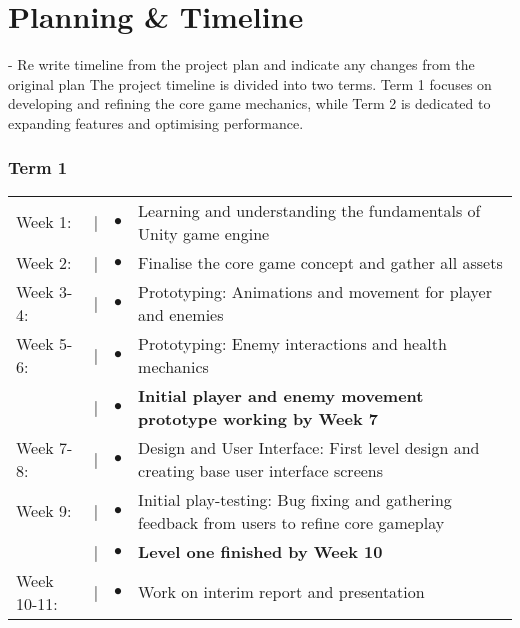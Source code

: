 \documentclass[]{final_report}
\begin{document}
\chapter{Planning \& Timeline}
- Re write timeline from the project plan and indicate any changes from the original plan\newline
The project timeline is divided into two terms. Term 1 focuses on developing and refining the core game mechanics, while Term 2 is dedicated to expanding features and optimising performance.

\subsection{Term 1}
\begin{tabular}{@{}p{2cm}@{}>{\raggedright\arraybackslash}p{0.5cm}@{}>{\raggedright\arraybackslash}p{0.5cm}@{}p{12cm}}
Week 1: & \textcolor{black}{|} & $\bullet$ & Learning and understanding the fundamentals of Unity game engine \\
Week 2: & \textcolor{black}{|} & $\bullet$ & Finalise the core game concept and gather all assets \\
Week 3-4: & \textcolor{black}{|} & $\bullet$ & Prototyping: Animations and movement for player and enemies\\
Week 5-6: & \textcolor{black}{|} & $\bullet$ &  Prototyping: Enemy interactions and health mechanics \\
& \textcolor{black}{|} & $\bullet$ & \textbf{Initial player and enemy movement prototype working by Week 7} \\
Week 7-8: & \textcolor{black}{|} & $\bullet$ & Design and User Interface: First level design and creating base user interface screens\\
Week 9: & \textcolor{black}{|} & $\bullet$ & Initial play-testing: Bug fixing and gathering feedback from users to refine core gameplay\\
& \textcolor{black}{|} & $\bullet$ & \textbf{Level one finished by Week 10} \\
Week 10-11: & \textcolor{black}{|} & $\bullet$ & Work on interim report and presentation \\
\end{tabular}
\end{document}
